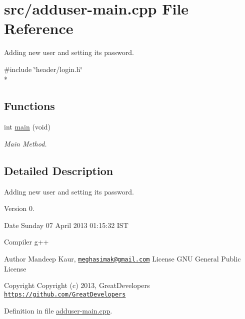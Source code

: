 \hypertarget{adduser-main_8cpp}{\section{src/adduser-\/main.cpp File Reference}
\label{adduser-main_8cpp}
}


Adding new user and setting its password.  


{\ttfamily \#include \char`\"{}header/login.\-h\char`\"{}}\\*
\subsection*{Functions}
\begin{DoxyCompactItemize}
\item 
int \hyperlink{adduser-main_8cpp_a568b3afc214ba30be5bf526d6b27b611}{main} (void)
\begin{DoxyCompactList}\small\item\em Main Method. \end{DoxyCompactList}\end{DoxyCompactItemize}


\subsection{Detailed Description}
Adding new user and setting its password. \begin{DoxyVersion}{Version}
0. 
\end{DoxyVersion}
\begin{DoxyDate}{Date}
Sunday 07 April 2013 01\-:15\-:32 I\-S\-T\par
 Compiler g++
\end{DoxyDate}
\begin{DoxyAuthor}{Author}
Mandeep Kaur, \href{mailto:meghasimak@gmail.com}{\tt meghasimak@gmail.\-com} License G\-N\-U General Public License 
\end{DoxyAuthor}
\begin{DoxyCopyright}{Copyright}
Copyright (c) 2013, Great\-Developers \href{https://github.com/GreatDevelopers}{\tt https\-://github.\-com/\-Great\-Developers} 
\end{DoxyCopyright}


Definition in file \hyperlink{adduser-main_8cpp_source}{adduser-\/main.\-cpp}.



